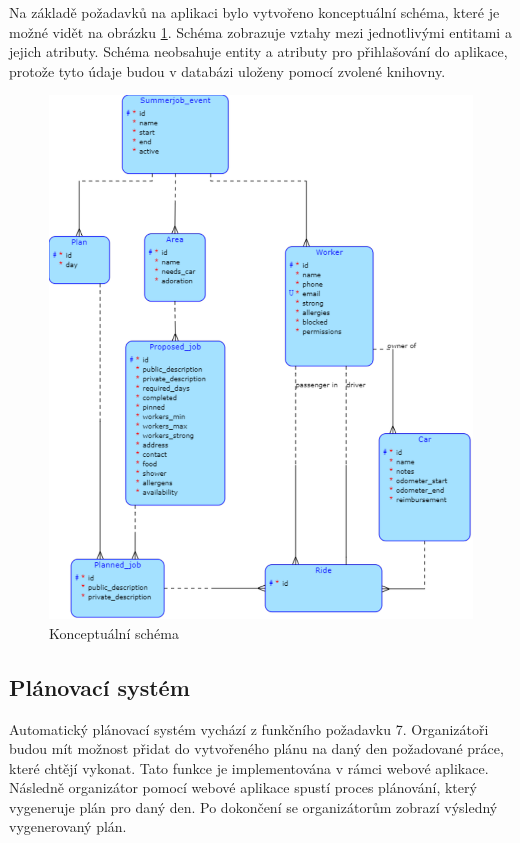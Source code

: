 Na základě požadavků na aplikaci bylo vytvořeno konceptuální schéma, které je možné vidět na obrázku \ref{fig:schema}. Schéma zobrazuje vztahy mezi jednotlivými entitami a jejich atributy.
Schéma neobsahuje entity a atributy pro přihlašování do aplikace, protože tyto údaje budou v databázi uloženy pomocí zvolené knihovny.

\begin{figure}[h]
    \centering
    \includegraphics[width=\textwidth]{chapters/images/schema}
    \caption{Konceptuální schéma}
    \label{fig:schema}
\end{figure}


\subsection{Plánovací systém}

Automatický plánovací systém vychází z funkčního požadavku 7. Organizátoři budou mít možnost přidat do vytvořeného plánu na daný den požadované práce, které
chtějí vykonat. Tato funkce je implementována v rámci webové aplikace. Následně organizátor pomocí webové aplikace spustí proces plánování, který vygeneruje plán pro
daný den. Po dokončení se organizátorům zobrazí výsledný vygenerovaný plán.

